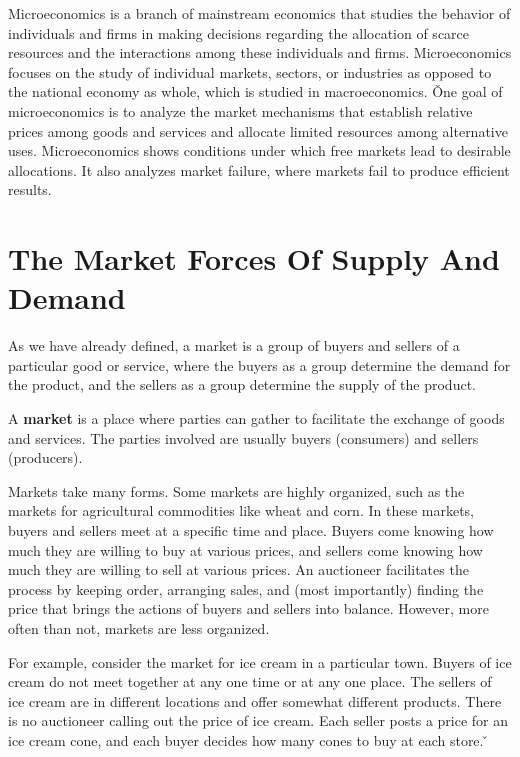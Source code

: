Microeconomics is a branch of mainstream economics that studies the behavior of individuals and firms in making
decisions regarding the allocation of scarce resources and the interactions among these individuals and firms.
Microeconomics focuses on the study of individual markets, sectors, or industries as opposed to the national economy
as whole, which is studied in macroeconomics. \v

One goal of microeconomics is to analyze the market mechanisms that establish relative prices among goods and
services and allocate limited resources among alternative uses. Microeconomics shows conditions under which free
markets lead to desirable allocations. It also analyzes market failure, where markets fail to produce efficient results.

\section{The Market Forces Of Supply And Demand}

As we have already defined, a market is a group of buyers and sellers of a particular good or service, where the
buyers as a group determine the demand for the product, and the sellers as a group determine the supply of the product.

\bd[Market]
A \textbf{market} is a place where parties can gather to facilitate the exchange of goods and services. The parties
involved are usually buyers (consumers) and sellers (producers).
\ed

Markets take many forms. Some markets are highly organized, such as the markets for agricultural commodities like
wheat and corn. In these markets, buyers and sellers meet at a specific time and place. Buyers come knowing how much
they are willing to buy at various prices, and sellers come knowing how much they are willing to sell at various
prices. An auctioneer facilitates the process by keeping order, arranging sales, and (most importantly) finding the
price that brings the actions of buyers and sellers into balance. However, more often than not, markets are less
organized.

\be
For example, consider the market for ice cream in a particular town. Buyers of ice cream do not meet together at any
one time or at any one place. The sellers of ice cream are in different locations and offer somewhat different
products. There is no auctioneer calling out the price of ice cream. Each seller posts a price for an ice cream cone,
and each buyer decides how many cones to buy at each store. \v

